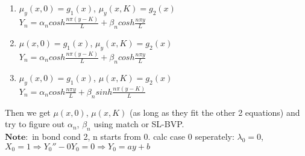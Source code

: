 \documentclass[10pt]{article}
\begin{document}
\begin{multicols}{2}
\begin{enumerate}
\begin{enumerate}
			\item $\mu_y(x,0) = g_1(x)$, $\mu_y(x,K) = g_2(x)$\\
			$Y_n = \alpha_n cosh\frac{n \pi (y-K)}{L} + \beta_n cosh\frac{n \pi y}{L}$ 
			\item $\mu(x,0) = g_1(x)$, $\mu_y(x,K) = g_2(x)$\\
			$Y_n = \alpha_n cosh\frac{n \pi (y-K)}{L} + \beta_n cosh\frac{n \pi y}{L}$ 
			\item $\mu_y(x,0) = g_1(x)$, $\mu(x,K) = g_2(x)$\\
			$Y_n = \alpha_n cosh\frac{n \pi y}{L} + \beta_n sinh\frac{n \pi (y-K)}{L}$                                                                       
		\end{enumerate}
		Then we get $\mu(x,0)$, $\mu(x,K)$ (as long as they fit the other 2 equations) and try to figure out $\alpha_n$, $\beta_n$ using match or SL-BVP. \\
		$\mathbf{Note}:$ in bond cond 2, n starts from 0. calc case 0 seperately: $\lambda_0 = 0$, $X_0 = 1 \Rightarrow Y_0'' - 0Y_0 = 0 \Rightarrow Y_0 = ay + b$\\
		\begin{comment}
			$\mathbf{Case2}$: $\lambda$:($Y(0) \ or \ Y'(0) = 0, Y(K) \ or \ Y'(K) = 0$)\\
			\begin{equation}
			\left\{
			\begin{array}{lr}
			Y''+\lambda X = 0, \ \ (SL-BVP)&\\
			\mu(0, y) = g_1(y), \mu(L, y) = g_2(x)\\
			\end{array}
			\right.
			\end{equation}
			$\Rightarrow$ find out $\lambda_n$ and $Y_n$ Then:
			$$ X''_n - \lambda_n X_n = 0, 0 < X < L$$
			$$ X_n = \alpha_n sinh\frac{n \pi x}{L} + \beta_n cosh\frac{n \pi x}{L} $$
			$$\mu(x,y) = \sum_{n = 1}^{\infty} (\alpha_n sinh\frac{n \pi x}{K} + \beta_n cosh\frac{n \pi x}{K}) Y_n$$
			For simplicity, we transform to:\\
			$$\mu(x,y) = \sum_{n = 1}^{\infty} (\alpha_n sinh\frac{n \pi x}{K} + \beta_n cosh\frac{n \pi (x-L)}{K}) Y_n$$
			Then we get $\mu(0, y)$, $\mu(L, y)$ (as long as they fit the other 2 equations) and try to figure out $\alpha_n$, $\beta_n$ using match or SL-BVP. \\
			$\mathbf{Note}:$ in bond cond 2, n starts from 0. calc case 0 seperately: $\lambda_0 = 0$, $Y_0 = 1 \Rightarrow X_0'' - 0X_0 = 0 \Rightarrow X_0 = ax + b$\\
		\end{comment}
		

\end{enumerate}
\end{multicols}
\end{document}
